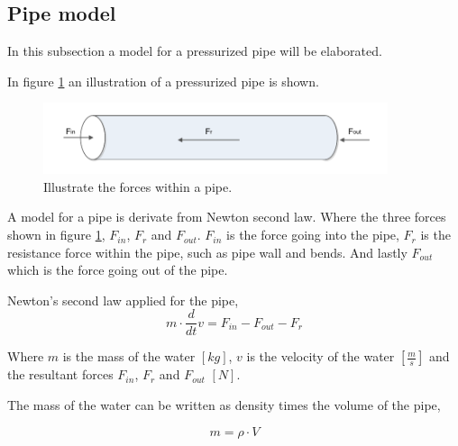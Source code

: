 
\subsection{Pipe model}\label{se:pipe_model}
In this subsection a model for a pressurized pipe will be elaborated. 

In figure \ref{fig:pipe_3d} an illustration of a pressurized pipe is shown.
\begin{figure}[H]
\centering
\includegraphics[width=0.9\textwidth]{report/modeling/pictures/pipe_3d.pdf}
\caption{Illustrate the forces within a pipe.}
\label{fig:pipe_3d}
\end{figure}


A model for a pipe is derivate from Newton second law. Where the three forces shown in figure \ref{fig:pipe_3d}, $F_{in}$, $F_r$ and $F_{out}$. $F_{in}$ is the force going into the pipe, $F_r$ is the resistance force within the pipe, such as pipe wall and bends. And lastly $F_{out}$ which is the force going out of the pipe. 

Newton's second law applied for the pipe, 
\begin{equation}\label{eq:pipe_newton}
m\cdot \frac{d}{dt}v = F_{in} - F_{out} - F_r 
\end{equation}

Where $m$ is the mass of the water $[kg]$, $v$ is the velocity of the water $\left[\frac{m}{s}\right]$ and the resultant forces $F_{in}$, $F_r$ and $F_{out}$ $[N]$.  

The mass of the water can be written as density times the volume of the pipe,

\begin{equation}
m = \rho \cdot V 
\end{equation}

